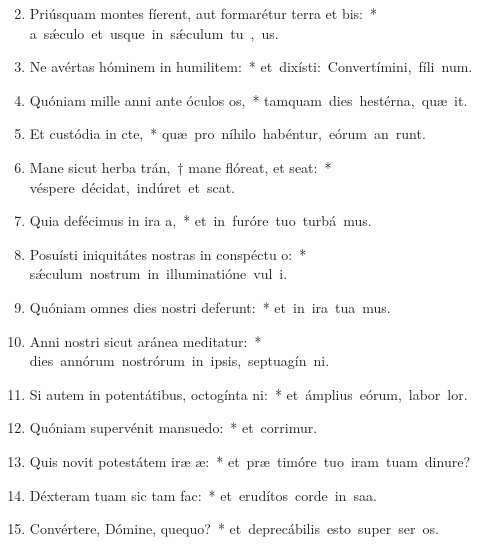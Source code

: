 \begin{flushleft}
\begin{enumerate}[leftmargin=*]
\setcounter{enumi}{1}


\item Priúsquam montes fíerent, aut formarétur terra et bis:~* \mbox{a s\'{\ae}culo et usque in s\'{\ae}culum tu , us.}
\item Ne avértas hóminem in humilitem:~* \mbox{et dixísti: Convertímini, fíli num.}
\item Quóniam mille anni ante óculos os,~* \mbox{tamquam dies hestérna, quæ it.}
\item Et custódia in cte,~* \mbox{quæ pro níhilo habéntur, eórum an runt.}
\item Mane sicut herba trán,~† mane flóreat, et seat:~* \mbox{véspere décidat, indúret et scat.}
\item Quia defécimus in ira a,~* \mbox{et in furóre tuo turbá mus.}
\item Posuísti iniquitátes nostras in conspéctu o:~* \mbox{s\'{\ae}culum nostrum in illuminatióne vul i.}
\item Quóniam omnes dies nostri deferunt:~* \mbox{et in ira tua mus.}
\item Anni nostri sicut aránea meditatur:~* \mbox{dies annórum nostrórum in ipsis, septuagín ni.}
\item Si autem in potentátibus, octogínta ni:~* \mbox{et ámplius eórum, labor  lor.}
\item Quóniam supervénit mansuedo:~* \mbox{et corrimur.}
\item Quis novit potestátem iræ æ:~* \mbox{et præ timóre tuo iram tuam dinure?}
\item Déxteram tuam sic tam fac:~* \mbox{et erudítos corde in saa.}
\item Convértere, Dómine, quequo?~* \mbox{et deprecábilis esto super ser os.}

\end{enumerate}
\end{flushleft}

